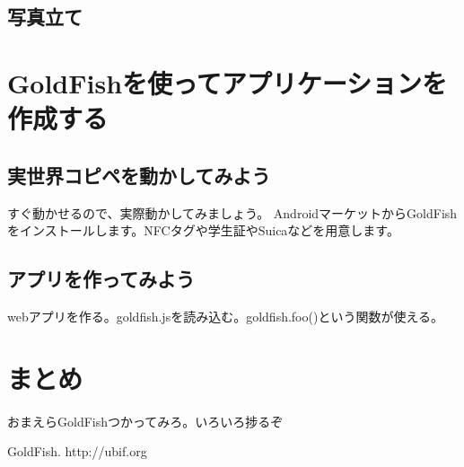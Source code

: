\subsection{写真立て}


\section{GoldFishを使ってアプリケーションを作成する}
\subsection{実世界コピペを動かしてみよう}
すぐ動かせるので、実際動かしてみましょう。
AndroidマーケットからGoldFishをインストールします。NFCタグや学生証やSuicaなどを用意します。

\subsection{アプリを作ってみよう}
webアプリを作る。goldfish.jsを読み込む。goldfish.foo()という関数が使える。

\section{まとめ}
おまえらGoldFishつかってみろ。いろいろ捗るぞ


\begin{thebibliography}{10}

GoldFish. http://ubif.org

\end{thebibliography}

